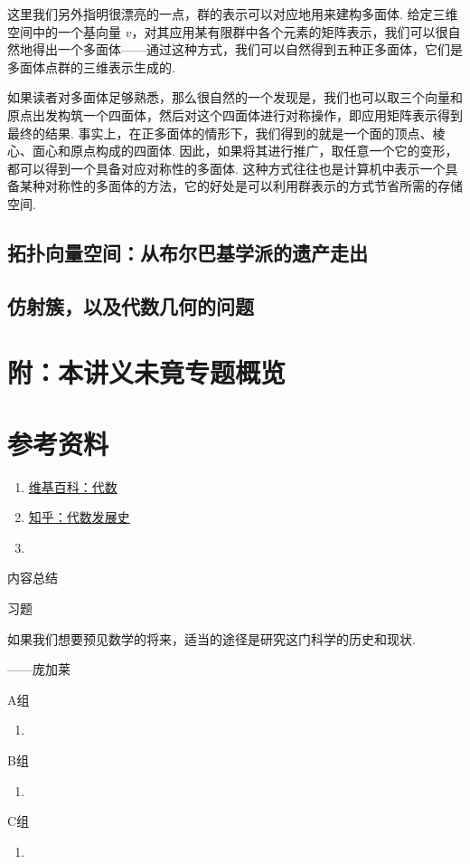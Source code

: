 这里我们另外指明很漂亮的一点，群的表示可以对应地用来建构多面体. 给定三维空间中的一个基向量 $v$，对其应用某有限群中各个元素的矩阵表示，我们可以很自然地得出一个多面体——通过这种方式，我们可以自然得到五种正多面体，它们是多面体点群的三维表示生成的.

如果读者对多面体足够熟悉，那么很自然的一个发现是，我们也可以取三个向量和原点出发构筑一个四面体，然后对这个四面体进行对称操作，即应用矩阵表示得到最终的结果. 事实上，在正多面体的情形下，我们得到的就是一个面的顶点、棱心、面心和原点构成的四面体. 因此，如果将其进行推广，取任意一个它的变形，都可以得到一个具备对应对称性的多面体. 这种方式往往也是计算机中表示一个具备某种对称性的多面体的方法，它的好处是可以利用群表示的方式节省所需的存储空间.

\subsection{拓扑向量空间：从布尔巴基学派的遗产走出}

\subsection{仿射簇，以及代数几何的问题}

\section*{附：本讲义未竟专题概览}

\section*{参考资料}

\begin{enumerate}
    \item \href{https://zh.wikipedia.org/wiki/%E4%BB%A3%E6%95%B0}{维基百科：代数}

    \item \href{https://zhuanlan.zhihu.com/p/574858845}{知乎：代数发展史}

    \item
\end{enumerate}
\vspace{2ex}
\centerline{\heiti \Large 内容总结}

\vspace{2ex}
\centerline{\heiti \Large 习题}

\vspace{2ex}
{\kaishu 如果我们想要预见数学的将来，适当的途径是研究这门科学的历史和现状.}
\begin{flushright}
    \kaishu
    ——庞加莱
\end{flushright}

\centerline{\heiti A组}
\begin{enumerate}
    \item
\end{enumerate}

\centerline{\heiti B组}
\begin{enumerate}
    \item
\end{enumerate}

\centerline{\heiti C组}
\begin{enumerate}
    \item
\end{enumerate}
